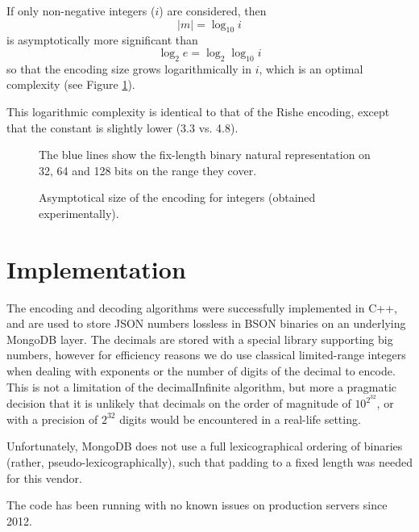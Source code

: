 \documentclass{acm_proc_article-sp}
\begin{document}
If only non-negative integers ($i$) are considered, then $$|m|= \log_{10} i$$ is asymptotically more significant than $$\log_2 e=\log_2\log_{10} i$$ so that the encoding size grows logarithmically in $i$, which is an optimal complexity (see Figure \ref{figure-size}).

This logarithmic complexity is identical to that of the Rishe encoding, except that the constant is slightly lower (3.3 vs. 4.8).


\begin{figure}
\label{figure-size}
\caption{Asymptotical size of the encoding for integers (obtained experimentally).}
The blue lines show the fix-length binary natural representation on 32, 64 and 128 bits on the range they cover.

\end{figure}

\section{Implementation}
\label{section-implementation}
The encoding and decoding algorithms were successfully implemented in C++, and are used to store JSON numbers lossless in BSON binaries on an underlying MongoDB layer. The decimals are stored with a special library supporting big numbers, however for efficiency reasons we do use classical limited-range integers when dealing with exponents or the number of digits of the decimal to encode. This is not a limitation of the decimalInfinite algorithm, but more a pragmatic decision that it is unlikely that decimals on the order of magnitude of $10^{2^{32}}$, or with a precision of $2^{32}$ digits would be encountered in a real-life setting.

Unfortunately, MongoDB does not use a full lexicographical ordering of binaries (rather, pseudo-lexicographically), such that padding to a fixed length was needed for this vendor.

The code has been running with no known issues on production servers since 2012.
\end{document}
